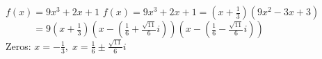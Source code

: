 {$f(x) = 9x^3+2x+1$}
{$f(x) = 9x^3+2x+1 = \left(x + \frac{1}{3}\right) \left(9x^2 - 3x + 3\right)$ \\
$\phantom{f(x)}= 9\left(x + \frac{1}{3}\right) \left(x - \left(\frac{1}{6} + \frac{\sqrt{11}}{6} i \right) \right) \left(x - \left(\frac{1}{6} - \frac{\sqrt{11}}{6} i \right) \right)$\\
Zeros:  $x = -\frac{1}{3}, \; x = \frac{1}{6} \pm \frac{\sqrt{11}}{6} i$}
